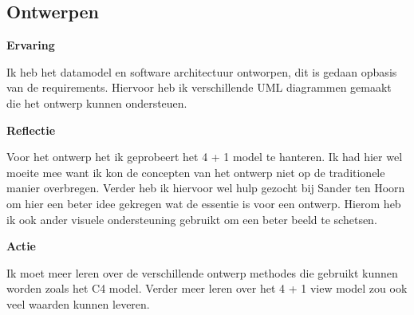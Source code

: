 \subsection{Ontwerpen}
\textbf{Ervaring}

\whitespace
Ik heb het datamodel en software architectuur ontworpen, dit is gedaan opbasis van de requirements.
Hiervoor heb ik verschillende UML diagrammen gemaakt die het ontwerp kunnen ondersteuen.

\whitespace
\textbf{Reflectie}

\whitespace
Voor het ontwerp het ik geprobeert het 4 + 1 model te hanteren. 
Ik had hier wel moeite mee want ik kon de concepten van het ontwerp niet op de traditionele manier overbregen.
Verder heb ik hiervoor wel hulp gezocht bij Sander ten Hoorn om hier een beter idee gekregen wat de essentie is voor een ontwerp.  
Hierom heb ik ook ander visuele ondersteuning gebruikt om een beter beeld te schetsen.

\whitespace
\textbf{Actie}

\whitespace
Ik moet meer leren over de verschillende ontwerp methodes die gebruikt kunnen worden zoals het C4 model.
Verder meer leren over het 4 + 1 view model zou ook veel waarden kunnen leveren.
